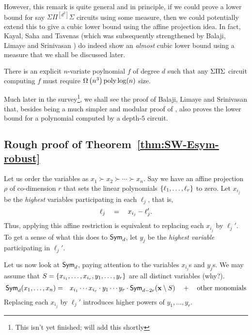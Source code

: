 However, this remark is quite general and in principle, if we could prove a lower bound for say $\Sigma\Pi^{[d^2]}\Sigma$ circuits using some measure, then we could potentially extend this to give a cubic lower bound using the affine projection idea.
In fact, Kayal, Saha and Tavenas \cite{kst16} (which was subsequently strengthened by Balaji, Limaye and Srinivasan \cite{BLS16}) do indeed show an \emph{almost} cubic lower bound using a measure that we shall be discussed later.


\begin{theorem} There is an explicit $n$-variate poylnomial $f$ of degree $d$ such that any $\Sigma\Pi\Sigma$ circuit computing $f$ must require $\Omega\left(n^3\right){\operatorname{poly} \log(n)}$ size. 
\end{theorem}

Much later in the survey\footnote{This isn't yet finished; will add this shortly}, we shall see the proof of Balaji, Limaye and Srinivasan \cite{BLS16} that, besides being a much simpler and modular proof of \cite{kst16}, also proves the lower bound for a polynomial computed by a depth-$5$ circuit.

\subsection{Rough proof of Theorem~\ref{thm:SW-Esym-robust}}

Let us order the variables as $x_1 \succ x_2 \succ \cdots \succ x_n$.
Say we have an affine projection $\rho$ of co-dimension $r$ that sets the linear polynomials $\left\{\ell_1,\ldots, \ell_r\right\}$ to zero. Let $x_{i_j}$ be the \emph{highest} variables participating in each $\ell_j$, that is,
\[
  \ell_j \quad = \quad x_{i_j} - \ell_j'.
\]
Thus, applying this affine restriction is equivalent to replacing each $x_{i_j}$ by $\ell_{j}'$. To get a sense of what this does to $\operatorname{\mathsf{Sym}}_d$, let $y_j$ be the \emph{highest variable} participating in $\ell_j'$.

Let us now look at $\operatorname{\mathsf{Sym}}_d$, paying attention to the variables $x_{i_j}$s and $y_j$s. We may assume that  $S = \left\{x_{i_1},\ldots, x_{i_r}, y_1,\ldots, y_r\right\}$ are all distinct variables (why?).
\begin{eqnarray*}
  \operatorname{\mathsf{Sym}}_d(x_1,\ldots, x_n) & = &  x_{i_1}\cdots x_{i_r}\cdot y_1\cdots y_r \cdot \operatorname{\mathsf{Sym}}_{d - 2r}(\mathbf{x} \setminus S) \quad + \quad \text{other monomials}
\end{eqnarray*}
Replacing each $x_{i_j}$ by $\ell_j'$ introduces higher powers of $y_1,\ldots, y_r$.

